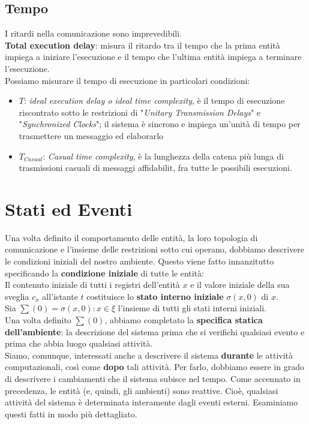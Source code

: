 \subsection{Tempo}
I ritardi nella comunicazione sono imprevedibili.\\
\textbf{Total execution delay}: misura il ritardo tra il tempo che la prima entità impiega a iniziare l'esecuzione e il tempo che l'ultima entità impiega a terminare l'esecuzione.\\
Possiamo misurare il tempo di esecuzione in particolari condizioni:
\begin{itemize}
    \item \textbf{$T$}: \textit{ideal execution delay o ideal time complexity}, è il tempo di esecuzione riscontrato sotto le restrizioni di "\textit{Unitary Transmission Delays}" e "\textit{Synchronized Clocks}"; il sistema è sincrono e impiega un'unità di tempo per trasmettere un messaggio ed elaborarlo
    \item \textbf{$T_{Casual}$}: \textit{Casual time complexity}, è la lunghezza della catena più lunga di trasmissioni casuali di messaggi affidabilit, fra tutte le possibili esecuzioni.
\end{itemize}

\section{Stati ed Eventi}
 Una volta definito il comportamento delle entità, la loro topologia di comunicazione e l'insieme delle restrizioni sotto cui operano, dobbiamo descrivere le condizioni iniziali del nostro ambiente. Questo viene fatto innanzitutto specificando la \textbf{condizione iniziale} di tutte le entità:\\
Il contenuto iniziale di tutti i registri dell'entità $x$ e il valore iniziale della sua sveglia $c_x$ all'istante $t$ costituisce lo \textbf{stato interno iniziale} $\sigma (x, 0)$ di $x$.\\
Sia $\sum(0) = {\sigma (x, 0) : x \in \xi}$ l'insieme di tutti gli stati interni iniziali.\\
Una volta definito $\sum(0)$, abbiamo completato la \textbf{specifica statica dell'ambiente}: la descrizione del sistema prima che si verifichi qualsiasi evento e prima che abbia luogo qualsiasi attività.\\
Siamo, comunque, interessati anche a descrivere il sistema \textbf{durante} le attività computazionali, così come \textbf{dopo} tali attività. Per farlo, dobbiamo essere in grado di descrivere i cambiamenti che il sistema subisce nel tempo. Come accennato in precedenza, le entità (e, quindi, gli ambienti) sono reattive. Cioè, qualsiasi attività del sistema è determinata interamente dagli eventi esterni. Esaminiamo questi fatti in modo più dettagliato.

